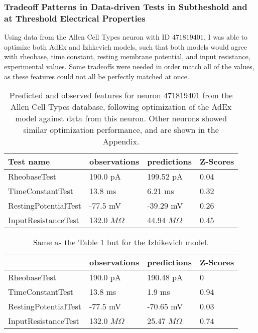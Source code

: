 \subsubsection{Tradeoff Patterns in Data-driven Tests in Subtheshold and at Threshold Electrical Properties}
\label{sec:rh_incomp}
Using data from the Allen Cell Types neuron with ID $471819401$,
I was able to optimize both AdEx and Izhkevich models, such that both models would agree with rheobase, time constant, resting membrane potential, and input resistance, experimental values. Some tradeoffs were needed in order match all of the values, as these features could not all be perfectly matched at once.
\begin{table}
\begin{center}
\begin{tabular}{|l|l|l|l|}
\toprule
Test name &   observations &    predictions & Z-Scores \\
\midrule
RheobaseTest         &       190.0 pA &      199.52 pA &     0.04 \\
TimeConstantTest     &        13.8 ms &        6.21 ms &     0.32 \\
RestingPotentialTest &       -77.5 mV &      -39.29 mV &     0.26 \\
InputResistanceTest  &  132.0 $M\Omega$ &  44.94 $M\Omega$ &     0.45 \\
\bottomrule
\end{tabular}
\caption[AdEx Model Fit Quality]{Predicted and observed features for neuron $471819401$ from the Allen Cell Types database, following optimization of the AdEx model against data from this neuron.
Other neurons showed similar optimization performance, and are shown in the Appendix.}
\label{tab:adex-allen}
\end{center}
\end{table}

\begin{table}
\begin{center}
\begin{tabular}{|l|l|l|l|}
\toprule
{} &   observations &    predictions & Z-Scores \\
\midrule
RheobaseTest         &       190.0 pA &      190.48 pA &        0 \\
TimeConstantTest     &        13.8 ms &         1.9 ms &     0.94 \\
RestingPotentialTest &       -77.5 mV &      -70.65 mV &     0.03 \\
InputResistanceTest  &  132.0 $M\Omega$ &  25.47 $M\Omega$ &     0.74 \\
\bottomrule
\end{tabular}
\caption[AdEx Model Fit Quality]{Same as the Table \ref{tab:adex-allen} but for the Izhikevich model.}
\label{tab:izhikevich-allen}
\end{center}
\end{table}

